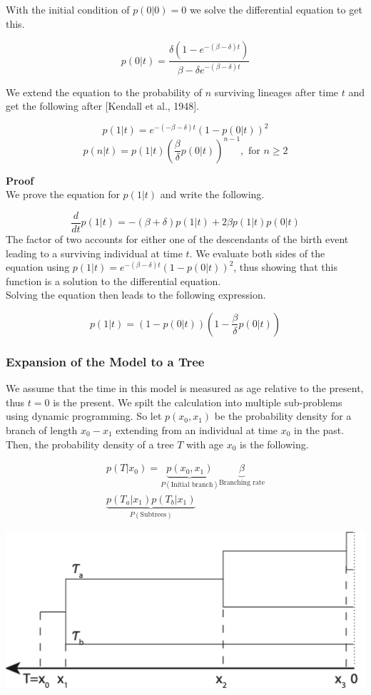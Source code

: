 \documentclass{article}
\begin{document}
\begin{multicols*}{3}
With the initial condition of $p(0|0) = 0$ we solve the differential equation to get this. 

$$p(0|t) = \frac{\delta(1-e^{-(\beta - \delta)t})}{\beta-\delta e^{-(\beta -\delta)t}}$$

We extend the equation to the probability of $n$ surviving lineages after time $t$ and get the following after [Kendall et al., 1948]. 

$$p(1|t) = e^{-(-\beta - \delta)t}(1-p(0|t))^2$$
$$p(n|t) = p(1|t)\left(\frac{\beta}{\delta}p(0|t)\right)^{n-1}, \text{ for } n\geq 2$$

\textbf{Proof}\\

We prove the equation for $p(1|t)$ and write the following. 

$$\frac{d}{dt}p(1|t) = -(\beta + \delta)p(1|t) + 2\beta p(1|t)p(0|t)$$
The factor of two accounts for either one of the descendants of the birth event leading to a surviving individual at time $t$.
We evaluate both sides of the equation using $p(1|t) = e^{-(\beta -\delta)t}(1-p(0|t))^2$, thus showing that this function is a solution to the differential equation.\\

Solving the equation then leads to the following expression. 

$$p(1|t) = (1-p(0|t))(1-\frac{\beta}{\delta}p(0|t))$$
\subsubsection{Expansion of the Model to a Tree}

We assume that the time in this model is measured as age relative to the present, thus $t = 0$ is the present. We spilt the calculation into multiple sub-problems using dynamic programming. So let $p(x_0, x_1)$ be the probability density for a branch of length $x_0 - x_1$ extending from an individual at time $x_0$ in the past. Then, the probability density of a tree $T$ with age $x_0$ is the following. 

\begin{align*}
p(T|x_0) = \underbrace{p(x_0,x_1)}_{P(\text{Initial branch})} \underbrace{\beta}_{\text{Branching rate}}\\ \underbrace{p(T_a|x_1)p(T_b|x_1)}_{P(\text{Subtrees})}
\end{align*}

\begin{center}
    \includegraphics[width=1\linewidth, angle=0.0]{treepd.png}
\end{center}


\end{multicols*}
\end{document}
